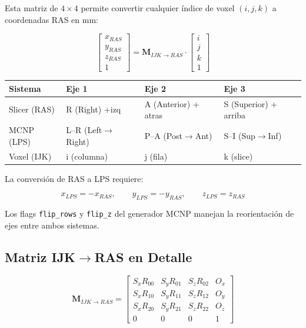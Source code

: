 \documentclass[12pt,a4paper]{article}
\begin{document}
Esta matriz de $4 \times 4$ permite convertir cualquier índice de voxel $(i,j,k)$ a coordenadas RAS en mm:

$$
\begin{bmatrix} x_{RAS} \\ y_{RAS} \\ z_{RAS} \\ 1 \end{bmatrix}
= \mathbf{M}_{IJK \to RAS} \cdot \begin{bmatrix} i \\ j \\ k \\ 1 \end{bmatrix}
$$


\begin{center}
\begin{tabular}{llll}
\toprule
\textbf{Sistema} & \textbf{Eje 1} & \textbf{Eje 2} & \textbf{Eje 3} \\
\midrule
Slicer (RAS) & R (Right) $+$izq & A (Anterior) $+$atras & S (Superior) $+$arriba \\
MCNP (LPS) & L--R (Left$\to$Right) & P--A (Post$\to$Ant) & S--I (Sup$\to$Inf) \\
Voxel (IJK) & i (columna) & j (fila) & k (slice) \\
\bottomrule
\end{tabular}
\end{center}

La conversión de RAS a LPS requiere:

$$
x_{LPS} = -x_{RAS},\qquad y_{LPS} = -y_{RAS},\qquad z_{LPS} = z_{RAS}
$$


Los flags \texttt{flip\_rows} y \texttt{flip\_z} del generador MCNP manejan la reorientación de ejes entre ambos sistemas.

\subsection{Matriz IJK$\to$RAS en Detalle}

$$
\mathbf{M}_{IJK \to RAS} = \begin{bmatrix}
S_x R_{00} & S_y R_{01} & S_z R_{02} & O_x \\
S_x R_{10} & S_y R_{11} & S_z R_{12} & O_y \\
S_x R_{20} & S_y R_{21} & S_z R_{22} & O_z \\
0 & 0 & 0 & 1
\end{bmatrix}
$$
\end{document}
